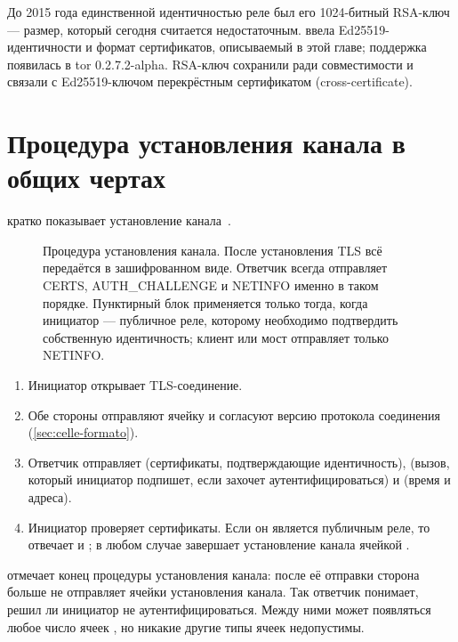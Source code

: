 \begin{storia}[От RSA к Ed25519]
До 2015 года единственной идентичностью реле был его 1024-битный RSA-ключ --- размер, который сегодня считается недостаточным.  ввела Ed25519-идентичности и формат сертификатов, описываемый в этой главе; поддержка появилась в tor 0.2.7.2-alpha. RSA-ключ сохранили ради совместимости и связали с Ed25519-ключом перекрёстным сертификатом (cross-certificate).
\end{storia}

\section{Процедура установления канала в общих чертах}\label{sec:canale-handshake}

 кратко показывает установление канала~.

\begin{figure}[htbp]
\centering

\caption{Процедура установления канала. После установления TLS всё передаётся в зашифрованном виде. Ответчик всегда отправляет CERTS, AUTH\_CHALLENGE и NETINFO именно в таком порядке. Пунктирный блок применяется только тогда, когда инициатор --- публичное реле, которому необходимо подтвердить собственную идентичность; клиент или мост отправляет только NETINFO.}
\label{fig:handshake-canale}
\end{figure}

\begin{enumerate}
  \item Инициатор открывает TLS-соединение.
  \item Обе стороны отправляют ячейку  и согласуют версию протокола соединения (\cref{sec:celle-formato}).
  \item Ответчик отправляет  (сертификаты, подтверждающие идентичность),  (вызов, который инициатор подпишет, если захочет аутентифицироваться) и  (время и адреса).
  \item Инициатор проверяет сертификаты. Если он является публичным реле, то отвечает  и ; в любом случае завершает установление канала ячейкой .
\end{enumerate}

 отмечает конец процедуры установления канала: после её отправки сторона больше не отправляет ячейки установления канала. Так ответчик понимает, решил ли инициатор не аутентифицироваться. Между ними может появляться любое число ячеек , но никакие другие типы ячеек недопустимы.

